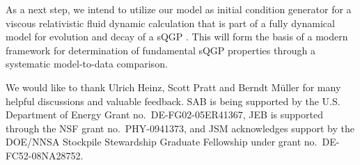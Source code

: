 \documentclass[aps,prc,reprint,amsmath,nofootinbib]{revtex4-1}
\begin{document}
As a next step, we intend to utilize our model as initial condition generator for a viscous relativistic fluid dynamic calculation that is part of a fully dynamical model for evolution and decay of a sQGP \cite{Shen:2014vra}.
This will form the basis of a modern framework for determination of fundamental sQGP properties through a systematic model-to-data comparison.


We would like to thank Ulrich Heinz, Scott Pratt and Berndt M\"uller for many helpful discussions and valuable feedback.
SAB is being supported by the U.S. Department of Energy Grant no.~DE-FG02-05ER41367,
JEB is supported through the NSF grant no.~PHY-0941373,
and JSM acknowledges support by the DOE/NNSA Stockpile Stewardship Graduate Fellowship under grant no.~DE-FC52-08NA28752.


%
\end{document}
